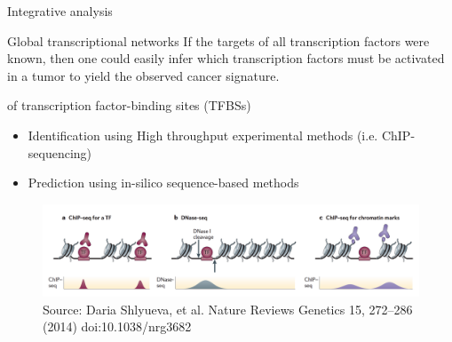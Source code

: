 \documentclass[slidestop,compress,11pt,xcolor=dvipsnames]{beamer}
\begin{document}
\begin{frame}{Integrative analysis}
 \vspace*{-0.3cm}
\begin{block}{Global transcriptional networks}
If the targets of all transcription factors were known, then one could easily infer which transcription factors must be activated in a tumor to yield the observed cancer signature.
\end{block}
\begin{exampleblock}{ of transcription factor-binding sites (TFBSs)}
\begin{itemize}
     \item Identification using High throughput experimental methods (i.e. ChIP-sequencing)
     \item Prediction using in-silico sequence-based methods
\end{itemize}
\end{exampleblock}
\vspace*{-0.3cm}
\begin{figure}
 \centering
 \includegraphics[width=1.0\linewidth]{intro/TF.png}{\tiny{\\Source: Daria Shlyueva, et al. Nature Reviews Genetics 15, 272–286 (2014) doi:10.1038/nrg3682}}
\end{figure}
\end{frame}
\end{document}
